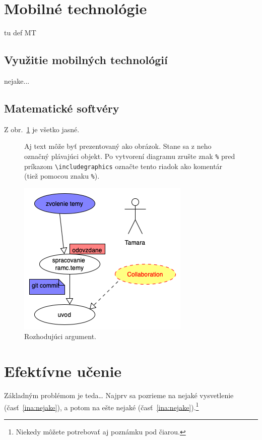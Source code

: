 \documentclass[10pt,twoside,slovak,a4paper]{article}
\begin{document}
\section{Mobilné technológie} \label{nejaka}

tu def MT 

\subsection{Využitie mobilných technológií} \label{ina:vyuzitie}

nejake...

\subsection{Matematické softvéry} \label{ina:softvery}

Z obr.~\ref{f:rozhod} je všetko jasné. 

\begin{figure}[tbh]
\centering
Aj text môže byť prezentovaný ako obrázok. Stane sa z neho označný plávajúci objekt. Po vytvorení diagramu zrušte znak \texttt{\%} pred príkazom \verb|\includegraphics| označte tento riadok ako komentár (tiež pomocou znaku \texttt{\%}).

\includegraphics[scale=0.5]{prvy.png}
\caption{Rozhodujúci argument.}
\label{f:rozhod}
\end{figure}



\section{Efektívne učenie} \label{ucenie}

Základným problémom je teda\ldots{} Najprv sa pozrieme na nejaké vysvetlenie (časť~\ref{ina:nejake}), a potom na ešte nejaké (časť~\ref{ina:nejake}).\footnote{Niekedy môžete potrebovať aj poznámku pod čiarou.}
\end{document}
